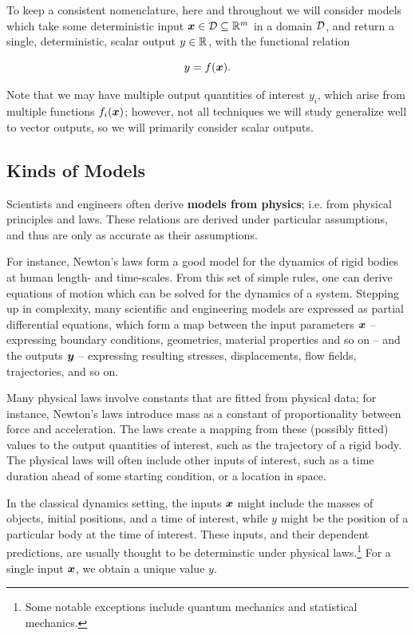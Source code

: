 \documentclass[../primer.tex]{subfiles}
\begin{document}
To keep a consistent nomenclature, here and throughout we will consider models
which take some deterministic input $\boldsymbol{x} \in \mathcal{D} \subseteq \mathbb{R}^{m}$ in a domain
$\mathcal{D}$, and return a single, deterministic, scalar output $y \in \mathbb{R}^{}$, with the
functional relation

\begin{equation}
  y = f(\boldsymbol{x}).
\end{equation}

\noindent Note that we may have multiple output quantities of interest $y_i$,
which arise from multiple functions $f_i(\boldsymbol{x})$; however, not all techniques we
will study generalize well to vector outputs, so we will primarily consider
scalar outputs.

\subsection{Kinds of Models}
Scientists and engineers often derive \textbf{models from physics}; i.e. from
physical principles and laws. These relations are derived under particular
assumptions, and thus are only as accurate as their assumptions.

For instance, Newton's laws form a good model for the dynamics of rigid bodies
at human length- and time-scales. From this set of simple rules, one can derive
equations of motion which can be solved for the dynamics of a system. Stepping
up in complexity, many scientific and engineering models are expressed as
partial differential equations, which form a map between the input parameters
$\boldsymbol{x}$ -- expressing boundary conditions, geometries, material properties and so
on -- and the outputs $\boldsymbol{y}$ -- expressing resulting stresses, displacements,
flow fields, trajectories, and so on.

Many physical laws involve constants that are fitted from physical data; for
instance, Newton's laws introduce mass as a constant of proportionality between
force and acceleration. The laws create a mapping from these (possibly fitted)
values to the output quantities of interest, such as the trajectory of a rigid
body. The physical laws will often include other inputs of interest, such as a
time duration ahead of some starting condition, or a location in space.

In the classical dynamics setting, the inputs $\boldsymbol{x}$ might include the masses of
objects, initial positions, and a time of interest, while $y$ might be the
position of a particular body at the time of interest. These inputs, and their
dependent predictions, are usually thought to be determinstic under physical
laws.\footnote{Some notable exceptions include quantum mechanics and statistical
  mechanics.} For a single input $\boldsymbol{x}$, we obtain a unique value $y$.
\end{document}
